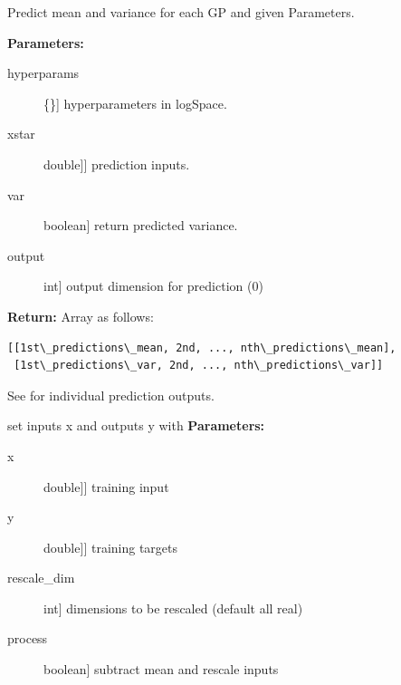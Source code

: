 \documentclass[letterpaper,10pt,english]{sphinxmanual}
\begin{document}
\begin{fulllineitems}
\begin{fulllineitems}
\begin{description}
\end{description}

\end{fulllineitems}


\begin{fulllineitems}
\label{gp:pygp.gp.composite.GroupGP.predict}
Predict mean and variance for each GP and given Parameters.

\textbf{Parameters:}
\begin{description}
\item[{hyperparams}] \leavevmode{[}\{\}{]}
hyperparameters in logSpace.

\item[{xstar}] \leavevmode{[}{[}double{]}{]}
prediction inputs.

\item[{var}] \leavevmode{[}boolean{]}
return predicted variance.

\item[{output}] \leavevmode{[}int{]}
output dimension for prediction (0)

\end{description}

\textbf{Return:}
Array as follows:

\begin{Verbatim}[commandchars=\\\{\}]
[[1st\_predictions\_mean, 2nd, ..., nth\_predictions\_mean],
 [1st\_predictions\_var, 2nd, ..., nth\_predictions\_var]]
\end{Verbatim}

See  for individual prediction outputs.

\end{fulllineitems}


\begin{fulllineitems}
\label{gp:pygp.gp.composite.GroupGP.setData}
set inputs x and outputs y with \textbf{Parameters:}
\begin{description}
\item[{x}] \leavevmode{[}{[}double{]}{]}
training input

\item[{y}] \leavevmode{[}{[}double{]}{]}
training targets

\item[{rescale\_dim}] \leavevmode{[}int{]}
dimensions to be rescaled (default all real)

\item[{process}] \leavevmode{[}boolean{]}
subtract mean and rescale inputs

\end{description}

\end{fulllineitems}


\end{fulllineitems}
\end{document}
